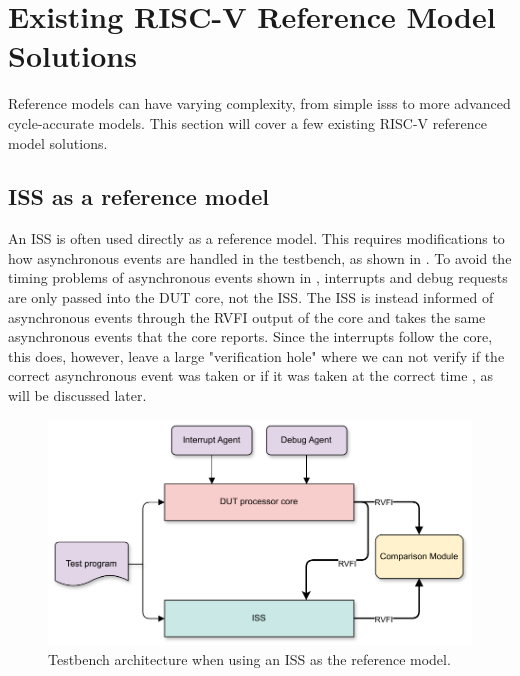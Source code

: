 \section{Existing RISC-V Reference Model Solutions}
\label{sec:bg_existingReference}

Reference models can have varying complexity, from simple  \acrshort{iss}s to more advanced cycle-accurate models. This section will cover a few existing RISC-V reference model solutions.

\subsection{ISS as a reference model}
\label{sec:bg_iss_refmod}

An ISS is often used directly as a reference model. This requires modifications to how asynchronous events are handled in the testbench, as shown in . To avoid the timing problems of asynchronous events shown in , interrupts and debug requests are only passed into the DUT core, not the ISS. The ISS is instead informed of asynchronous events through the RVFI output of the core and takes the same asynchronous events that the core reports. Since the interrupts follow the core, this does, however, leave a large "verification hole" where we can not verify if the correct asynchronous event was taken or if it was taken at the correct time \cite{taylorAdvancedRISCVVerification2023}, as will be discussed later. 

\begin{figure}
    \centering
    \includegraphics[width=0.75\linewidth]{figures/ISS_architecture.pdf}
    \caption{Testbench architecture when using an ISS as the reference model.}
    \label{fig:iss_testbench}
\end{figure}
%

